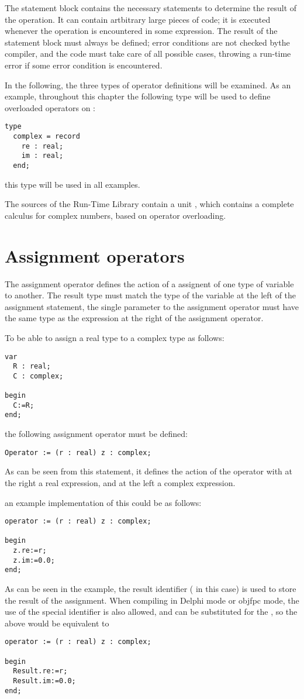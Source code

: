\documentclass{report}
\begin{document}
The statement block contains the necessary statements to determine the
result of the operation. It can contain artbitrary large pieces of code;
it is executed whenever the operation is encountered in some expression.
The result of the statement block must always be defined; error conditions
are not checked bythe compiler, and the code must take care of all possible
cases, throwing a run-time error if some error condition is encountered.

In the following, the three types of operator definitions will be examined.
As an example, throughout this chapter the following type will be used to
define overloaded operators on :
\begin{verbatim}
type 
  complex = record
    re : real;
    im : real;
  end;        
\end{verbatim}
this type will be used in all examples.

The sources of the Run-Time Library contain a unit , 
which contains a complete calculus for complex numbers, based on 
operator overloading.

\section{Assignment operators}

The assignment operator defines the action of a assignent of one type of
variable to another. The result type must match the type of the variable
at the left of the assignment statement, the single parameter to the
assignment operator must have the same type as the expression at the 
right of the assignment operator.

To be able to assign a real type to a complex type as follows:
\begin{verbatim}
var 
  R : real;
  C : complex;

begin
  C:=R;
end;
\end{verbatim}
the following assignment operator must be defined: 

\begin{verbatim}
Operator := (r : real) z : complex;
\end{verbatim}
As can be seen from this statement, it defines the action of the operator
\var{:=} with at the right a real expression, and at the left a complex
expression. 

an example implementation of this could be as follows:
\begin{verbatim}
operator := (r : real) z : complex;
    
begin
  z.re:=r;
  z.im:=0.0;
end;
\end{verbatim}
As can be seen in the example, the result identifier ( in this case)
is used to store the result of the assignment. When compiling in Delphi mode
or objfpc mode, the use of the special identifier  is also
allowed, and can be substituted for the , so the above would be
equivalent to
\begin{verbatim}
operator := (r : real) z : complex;
    
begin
  Result.re:=r;
  Result.im:=0.0;
end;
\end{verbatim}
\end{document}
